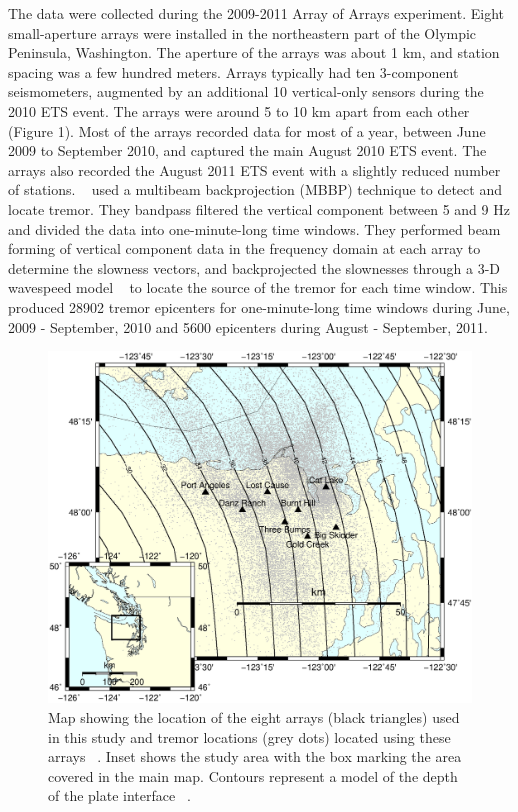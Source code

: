 \documentclass[draft]{agujournal2019}
\begin{document}
The data were collected during the 2009-2011 Array of Arrays experiment. Eight small-aperture arrays were installed in the northeastern part of the Olympic Peninsula, Washington. The aperture of the arrays was about 1 km, and station spacing was a few hundred meters. Arrays typically had ten 3-component seismometers, augmented by an additional 10 vertical-only sensors during the 2010 ETS event.  The arrays were around 5 to 10 km apart from each other (Figure 1). Most of the arrays recorded data  for most of  a year, between June 2009 to September 2010, and captured the main August 2010 ETS event. The arrays also recorded the August 2011 ETS event with a slightly reduced number of stations. ~ used a multibeam backprojection (MBBP) technique to detect and locate tremor. They bandpass filtered the vertical component between 5 and 9 Hz and divided the data into one-minute-long time windows. They performed beam forming of vertical component data in the frequency domain at each array to determine the slowness vectors, and backprojected the slownesses through a 3-D wavespeed model ~\cite{PRE_2003} to locate the source of the tremor for each time window. This produced 28902 tremor epicenters for one-minute-long time windows during June, 2009 - September, 2010 and 5600 epicenters during August - September, 2011.

\begin{figure}
\noindent\includegraphics[width=\textwidth, trim={0cm 2.5cm 0cm 9.5cm},clip]{figures/arrays_location.eps}
\caption{Map showing the location of the eight arrays (black triangles) used in this study and tremor locations (grey dots) located using these arrays ~\cite{GHO_2012}. Inset shows the study area with the box marking the area covered in the main map. Contours represent a model of the depth of the plate interface ~\cite{MCC_2006}.}
\label{pngfiguresample}
\end{figure}
\end{document}
